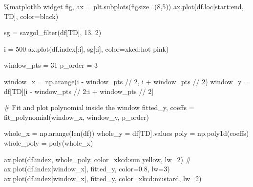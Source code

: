 \documentclass[
  letterpaper,
  DIV=11,
  numbers=noendperiod,
  oneside]{scrreprt}
\newenvironment{Shaded}{\begin{snugshade}}{\end{snugshade}}
\newcommand{\BuiltInTok}[1]{\textcolor[rgb]{0.00,0.23,0.31}{#1}}
\newcommand{\CommentTok}[1]{\textcolor[rgb]{0.37,0.37,0.37}{#1}}
\newcommand{\DecValTok}[1]{\textcolor[rgb]{0.68,0.00,0.00}{#1}}
\newcommand{\NormalTok}[1]{\textcolor[rgb]{0.00,0.23,0.31}{#1}}
\newcommand{\OperatorTok}[1]{\textcolor[rgb]{0.37,0.37,0.37}{#1}}
\newcommand{\StringTok}[1]{\textcolor[rgb]{0.13,0.47,0.30}{#1}}
\begin{document}
\begin{Shaded}
\begin{Highlighting}[]
\OperatorTok{\%}\NormalTok{matplotlib widget}
\NormalTok{fig, ax }\OperatorTok{=}\NormalTok{ plt.subplots(figsize}\OperatorTok{=}\NormalTok{(}\DecValTok{8}\NormalTok{,}\DecValTok{5}\NormalTok{))}
\NormalTok{ax.plot(df.loc[start:end, }\StringTok{\textquotesingle{}TD\textquotesingle{}}\NormalTok{], color}\OperatorTok{=}\StringTok{\textquotesingle{}black\textquotesingle{}}\NormalTok{)}

\NormalTok{sg }\OperatorTok{=}\NormalTok{ savgol\_filter(df[}\StringTok{\textquotesingle{}TD\textquotesingle{}}\NormalTok{], }\DecValTok{13}\NormalTok{, }\DecValTok{2}\NormalTok{)}

\NormalTok{i }\OperatorTok{=} \DecValTok{500}
\NormalTok{ax.plot(df.index[:i], sg[:i], color}\OperatorTok{=}\StringTok{\textquotesingle{}xkcd:hot pink\textquotesingle{}}\NormalTok{)}

\NormalTok{window\_pts }\OperatorTok{=} \DecValTok{31}
\NormalTok{p\_order }\OperatorTok{=} \DecValTok{3}

\NormalTok{window\_x }\OperatorTok{=}\NormalTok{ np.arange(i }\OperatorTok{{-}}\NormalTok{ window\_pts }\OperatorTok{//} \DecValTok{2}\NormalTok{, i }\OperatorTok{+}\NormalTok{ window\_pts }\OperatorTok{//} \DecValTok{2}\NormalTok{)}
\NormalTok{window\_y }\OperatorTok{=}\NormalTok{ df[}\StringTok{\textquotesingle{}TD\textquotesingle{}}\NormalTok{][i }\OperatorTok{{-}}\NormalTok{ window\_pts }\OperatorTok{//} \DecValTok{2}\NormalTok{:i }\OperatorTok{+}\NormalTok{ window\_pts }\OperatorTok{//} \DecValTok{2}\NormalTok{]}

\CommentTok{\# Fit and plot polynomial inside the window}
\NormalTok{fitted\_y, coeffs }\OperatorTok{=}\NormalTok{ fit\_polynomial(window\_x, window\_y, p\_order)}

\NormalTok{whole\_x }\OperatorTok{=}\NormalTok{ np.arange(}\BuiltInTok{len}\NormalTok{(df))}
\NormalTok{whole\_y }\OperatorTok{=}\NormalTok{ df[}\StringTok{\textquotesingle{}TD\textquotesingle{}}\NormalTok{].values}
\NormalTok{poly }\OperatorTok{=}\NormalTok{ np.poly1d(coeffs)}
\NormalTok{whole\_poly }\OperatorTok{=}\NormalTok{ poly(whole\_x)}

\NormalTok{ax.plot(df.index, whole\_poly, color}\OperatorTok{=}\StringTok{\textquotesingle{}xkcd:sun yellow\textquotesingle{}}\NormalTok{, lw}\OperatorTok{=}\DecValTok{2}\NormalTok{)}
\CommentTok{\# ax.plot(df.index[window\_x], fitted\_y, color=\textquotesingle{}0.8\textquotesingle{}, lw=3)}
\NormalTok{ax.plot(df.index[window\_x], fitted\_y, color}\OperatorTok{=}\StringTok{\textquotesingle{}xkcd:mustard\textquotesingle{}}\NormalTok{, lw}\OperatorTok{=}\DecValTok{2}\NormalTok{)}




\end{Highlighting}
\end{Shaded}
\end{document}
